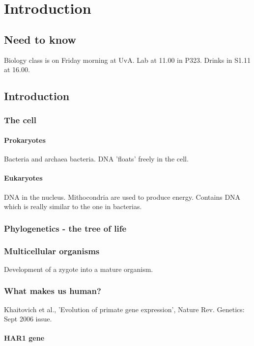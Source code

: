 \chapter{Introduction}

\section{Need to know}

Biology class is on Friday morning at UvA.
Lab at 11.00 in P323.
Drinks in S1.11 at 16.00.

\section{Introduction}

\subsection{The cell}

\subsubsection{Prokaryotes}%

Bacteria and archaea bacteria. DNA 'floats' freely in the cell.

\subsubsection{Eukaryotes}

DNA in the nucleus.
Mithocondria are used to produce energy. Contains DNA which is really similar
to the one in bacterias.

\subsection{Phylogenetics - the tree of life}


\subsection{Multicellular organisms}

Development of a zygote into a mature organism.


\subsection{What makes us human?}

Khaitovich et al., 'Evolution of primate gene expression', Nature Rev. 
Genetics: Sept 2006 issue.

\subsubsection{HAR1 gene}

